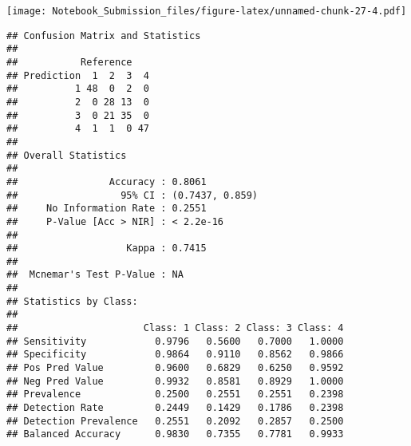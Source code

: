 \documentclass[
]{article}
\newenvironment{Shaded}{\begin{snugshade}}{\end{snugshade}}
\newcommand{\CommentTok}[1]{\textcolor[rgb]{0.56,0.35,0.01}{\textit{#1}}}
\newcommand{\DataTypeTok}[1]{\textcolor[rgb]{0.13,0.29,0.53}{#1}}
\newcommand{\DecValTok}[1]{\textcolor[rgb]{0.00,0.00,0.81}{#1}}
\newcommand{\KeywordTok}[1]{\textcolor[rgb]{0.13,0.29,0.53}{\textbf{#1}}}
\newcommand{\NormalTok}[1]{#1}
\newcommand{\OperatorTok}[1]{\textcolor[rgb]{0.81,0.36,0.00}{\textbf{#1}}}
\newcommand{\StringTok}[1]{\textcolor[rgb]{0.31,0.60,0.02}{#1}}
\begin{document}
\texttt{[image: Notebook\_Submission\_files/figure-latex/unnamed-chunk-27-4.pdf]}

\begin{Shaded}
\end{Shaded}

\begin{verbatim}
## Confusion Matrix and Statistics
## 
##           Reference
## Prediction  1  2  3  4
##          1 48  0  2  0
##          2  0 28 13  0
##          3  0 21 35  0
##          4  1  1  0 47
## 
## Overall Statistics
##                                          
##                Accuracy : 0.8061         
##                  95% CI : (0.7437, 0.859)
##     No Information Rate : 0.2551         
##     P-Value [Acc > NIR] : < 2.2e-16      
##                                          
##                   Kappa : 0.7415         
##                                          
##  Mcnemar's Test P-Value : NA             
## 
## Statistics by Class:
## 
##                      Class: 1 Class: 2 Class: 3 Class: 4
## Sensitivity            0.9796   0.5600   0.7000   1.0000
## Specificity            0.9864   0.9110   0.8562   0.9866
## Pos Pred Value         0.9600   0.6829   0.6250   0.9592
## Neg Pred Value         0.9932   0.8581   0.8929   1.0000
## Prevalence             0.2500   0.2551   0.2551   0.2398
## Detection Rate         0.2449   0.1429   0.1786   0.2398
## Detection Prevalence   0.2551   0.2092   0.2857   0.2500
## Balanced Accuracy      0.9830   0.7355   0.7781   0.9933
\end{verbatim}

\begin{Shaded}
\end{Shaded}
\end{document}
